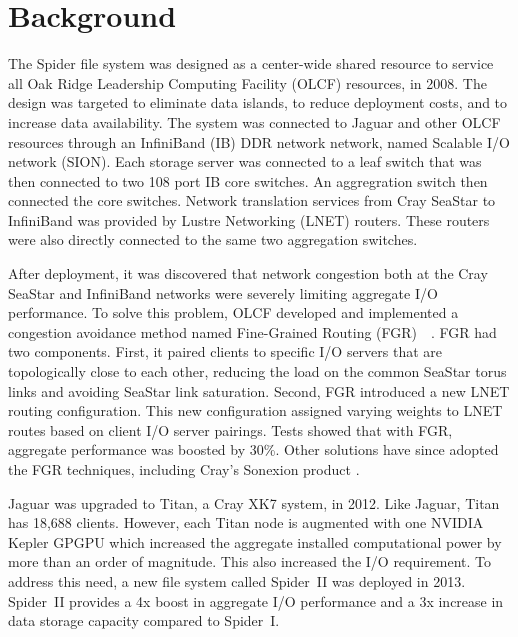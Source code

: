 \section{Background}

The Spider file system was designed as a center-wide shared resource to service
all Oak Ridge Leadership Computing Facility (OLCF) resources, in 2008. The
design was targeted to eliminate data islands, to reduce deployment costs, and
to increase data availability. The system was connected to Jaguar and other
OLCF resources through an InfiniBand (IB) DDR network network, named Scalable
I/O network (SION).  Each storage server was connected to a leaf switch that
was then connected to two 108 port IB core switches.  An aggregration switch
then connected the core switches.  Network translation services from Cray
SeaStar to InfiniBand was provided by Lustre Networking (LNET) routers. These
routers were also directly connected to the same two aggregation switches.    

After deployment, it was discovered that network congestion both at the Cray
SeaStar and InfiniBand networks were severely limiting aggregate I/O
performance. To solve this problem, OLCF developed and implemented a congestion
avoidance method named Fine-Grained Routing
(FGR)~\cite{dillow-fgr}~\cite{dillow-fgr2}. FGR had two components.  First, it
paired clients to specific I/O servers that are topologically close to each
other, reducing the load on the common SeaStar torus links and avoiding SeaStar
link saturation. Second, FGR introduced a new LNET routing configuration. This
new configuration assigned varying weights to LNET routes based on client I/O
server pairings. Tests showed that with FGR, aggregate performance was boosted
by 30\%.  Other solutions have since adopted the FGR
techniques, including Cray's Sonexion product \cite{cray-fgr}.
 
Jaguar was upgraded to Titan, a Cray XK7 system, in 2012. Like Jaguar, Titan has 18,688 clients.
However, each Titan node is augmented with one NVIDIA Kepler GPGPU
which increased the aggregate installed computational power by more than an
order of magnitude.  This also increased the I/O requirement. To address this
need, a new file system called Spider~II was deployed in 2013. Spider~II
provides a 4x boost in aggregate I/O performance and a 3x increase in data
storage capacity compared to Spider~I.

